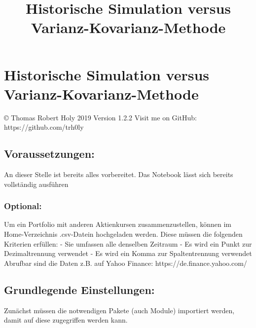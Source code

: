 \documentclass[paper=landscape]{scrartcl}
\title{Historische Simulation versus Varianz-Kovarianz-Methode}
\begin{document}
    
    
    \maketitle
    
    

    
    \hypertarget{historische-simulation-versus-varianz-kovarianz-methode}{%
\section{Historische Simulation versus
Varianz-Kovarianz-Methode}\label{historische-simulation-versus-varianz-kovarianz-methode}}

© Thomas Robert Holy 2019 Version 1.2.2 Visit me on GitHub:
https://github.com/trh0ly

\hypertarget{voraussetzungen}{%
\subsection{Voraussetzungen:}\label{voraussetzungen}}

An dieser Stelle ist bereits alles vorbereitet. Das Notebook lässt sich
bereits vollständig ausführen

\hypertarget{optional}{%
\subsubsection{Optional:}\label{optional}}

Um ein Portfolio mit anderen Aktienkursen zusammenzustellen, können im
Home-Verzeichnis .csv-Datein hochgeladen werden. Diese müssen die
folgenden Kriterien erfüllen: - Sie umfassen alle denselben Zeitraum -
Es wird ein Punkt zur Dezimaltrennung verwendet - Es wird ein Komma zur
Spaltentrennung verwendet Abrufbar sind die Daten z.B. auf Yahoo
Finance: https://de.finance.yahoo.com/

\hypertarget{grundlegende-einstellungen}{%
\subsection{Grundlegende
Einstellungen:}\label{grundlegende-einstellungen}}

Zunächst müssen die notwendigen Pakete (auch Module) importiert werden,
damit auf diese zugegriffen werden kann.
\end{document}
